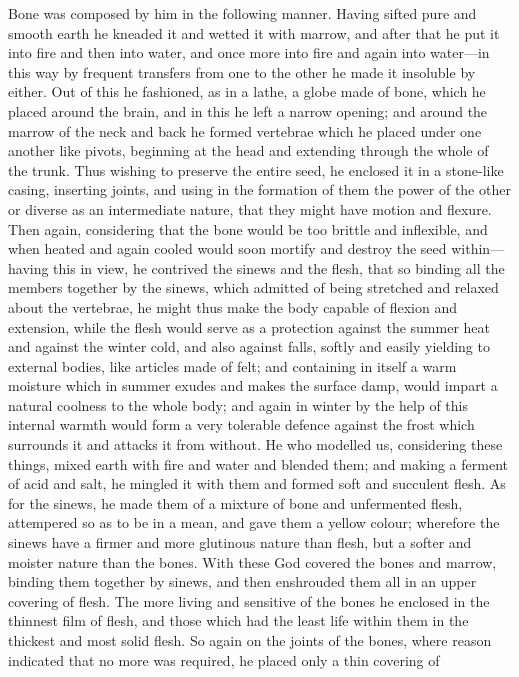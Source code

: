 Bone was composed by him in the following manner. Having sifted pure and
smooth earth he kneaded it and wetted it with marrow, and after that he
put it into fire and then into water, and once more into fire and again
into water—in this way by frequent transfers from one to the other
he made it insoluble by either. Out of this he fashioned, as in a lathe, a
globe made of bone, which he placed around the brain, and in this he left
a narrow opening; and around the marrow of the neck and back he formed
vertebrae which he placed under one another like pivots, beginning at the
head and extending through the whole of the trunk. Thus wishing to
preserve the entire seed, he enclosed it in a stone-like casing, inserting
joints, and using in the formation of them the power of the other or
diverse as an intermediate nature, that they might have motion and
flexure. Then again, considering that the bone would be too brittle and
inflexible, and when heated and again cooled would soon mortify and
destroy the seed within—having this in view, he contrived the sinews
and the flesh, that so binding all the members together by the sinews,
which admitted of being stretched and relaxed about the vertebrae, he
might thus make the body capable of flexion and extension, while the flesh
would serve as a protection against the summer heat and against the winter
cold, and also against falls, softly and easily yielding to external
bodies, like articles made of felt; and containing in itself a warm
moisture which in summer exudes and makes the surface damp, would impart a
natural coolness to the whole body; and again in winter by the help of
this internal warmth would form a very tolerable defence against the frost
which surrounds it and attacks it from without. He who modelled us,
considering these things, mixed earth with fire and water and blended
them; and making a ferment of acid and salt, he mingled it with them and
formed soft and succulent flesh. As for the sinews, he made them of a
mixture of bone and unfermented flesh, attempered so as to be in a mean,
and gave them a yellow colour; wherefore the sinews have a firmer and more
glutinous nature than flesh, but a softer and moister nature than the
bones. With these God covered the bones and marrow, binding them together
by sinews, and then enshrouded them all in an upper covering of flesh. The
more living and sensitive of the bones he enclosed in the thinnest film of
flesh, and those which had the least life within them in the thickest and
most solid flesh. So again on the joints of the bones, where reason
indicated that no more was required, he placed only a thin covering of
